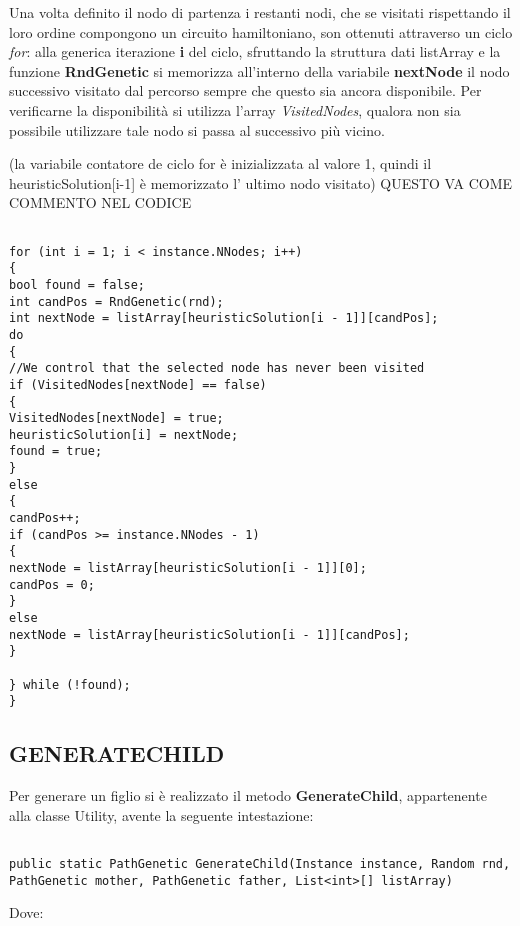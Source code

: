 \documentclass[11pt]{article}
\begin{document}
Una volta definito il nodo di partenza i restanti nodi, che se visitati rispettando il loro ordine compongono un circuito hamiltoniano, son ottenuti attraverso un ciclo \textit{for}: alla generica iterazione \textbf{i} del ciclo, sfruttando la struttura dati listArray e la funzione \textbf{RndGenetic} si memorizza all'interno della variabile \textbf{nextNode} il nodo successivo visitato dal percorso sempre che questo sia ancora disponibile. Per verificarne la disponibilità si utilizza l'array \textit{VisitedNodes}, qualora non sia possibile utilizzare tale nodo si passa al successivo più vicino.


(la variabile contatore de ciclo for è inizializzata al valore 1, quindi il heuristicSolution[i-1] è memorizzato l' ultimo nodo visitato)  QUESTO VA COME COMMENTO NEL CODICE

\begin{lstlisting}

for (int i = 1; i < instance.NNodes; i++)
{
bool found = false;
int candPos = RndGenetic(rnd);
int nextNode = listArray[heuristicSolution[i - 1]][candPos];
do
{
//We control that the selected node has never been visited
if (VisitedNodes[nextNode] == false)
{
VisitedNodes[nextNode] = true;
heuristicSolution[i] = nextNode;
found = true;
}
else
{
candPos++;
if (candPos >= instance.NNodes - 1)
{
nextNode = listArray[heuristicSolution[i - 1]][0];
candPos = 0;
}
else
nextNode = listArray[heuristicSolution[i - 1]][candPos];
}

} while (!found);
}

\end{lstlisting}

\subsection*{GENERATECHILD}
\label{sec:GenerateChildS}

Per generare un figlio si è realizzato il metodo \textbf{GenerateChild}, appartenente alla classe Utility, avente la seguente intestazione:

\begin{lstlisting}

public static PathGenetic GenerateChild(Instance instance, Random rnd, PathGenetic mother, PathGenetic father, List<int>[] listArray)

\end{lstlisting}

Dove:
\end{document}
